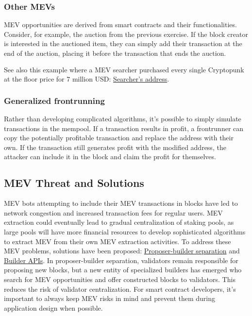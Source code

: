 \documentclass[12pt]{article}
\begin{document}
\subsubsection*{Other MEVs}
MEV opportunities are derived from smart contracts and their functionalities. Consider, for example, the auction from the previous exercise. If the block creator is interested in the auctioned item, they can simply add their transaction at the end of the auction, placing it before the transaction that ends the auction.

See also this example where a MEV searcher purchased every single Cryptopunk at the floor price for 7 million USD: \href{https://etherscan.io/address/0x650dCdEB6ecF05aE3CAF30A70966E2F395d5E9E5}{Searcher's address}.

\subsubsection*{Generalized frontrunning}

Rather than developing complicated algorithms, it's possible to simply simulate transactions in the mempool. If a transaction results in profit, a frontrunner can copy the potentially profitable transaction and replace the address with their own. If the transaction still generates profit with the modified address, the attacker can include it in the block and claim the profit for themselves.

\subsection{MEV Threat and Solutions}

MEV bots attempting to include their MEV transactions in blocks have led to network congestion and increased transaction fees for regular users. MEV extraction could eventually lead to gradual centralization of staking pools, as large pools will have more financial resources to develop sophisticated algorithms to extract MEV from their own MEV extraction activities. To address these MEV problems, solutions have been proposed: \href{https://ethereum.org/en/developers/docs/mev/#proposer-builder-separation}{Proposer-builder separation} and \href{https://ethereum.org/en/developers/docs/mev/#builder-api}{Builder APIs}. In proposer-builder separation, validators remain responsible for proposing new blocks, but a new entity of specialized builders has emerged who search for MEV opportunities and offer constructed blocks to validators. This reduces the risk of validator centralization. For smart contract developers, it's important to always keep MEV risks in mind and prevent them during application design when possible.
\end{document}

